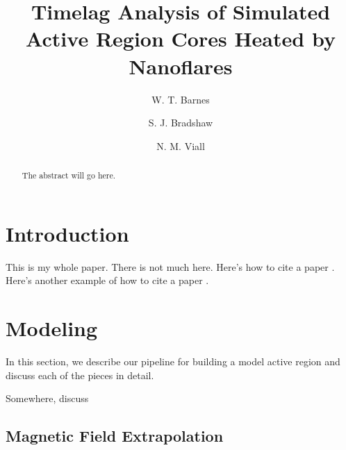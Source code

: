 \documentclass[preprint,linenumbers]{aastex62}
\begin{document}
\title{Timelag Analysis of Simulated Active Region Cores Heated by Nanoflares}
\author[0000-0001-9642-6089]{W. T. Barnes}
\author{S. J. Bradshaw}
\author{N. M. Viall}
\begin{abstract}
The abstract will go here.
\end{abstract}
\section{Introduction}\label{introduction}

This is my whole paper. There is not much here. Here's how to cite a
paper \citet{viall_evidence_2012}. Here's another example of how to cite
a paper \citep{warren_constraints_2011}.


\section{Modeling}
\label{modeling}
In this section, we describe our pipeline for building a model active region and discuss each of the pieces in detail.

Somewhere, discuss 

\subsection{Magnetic Field Extrapolation}
\label{field}
\end{document}
